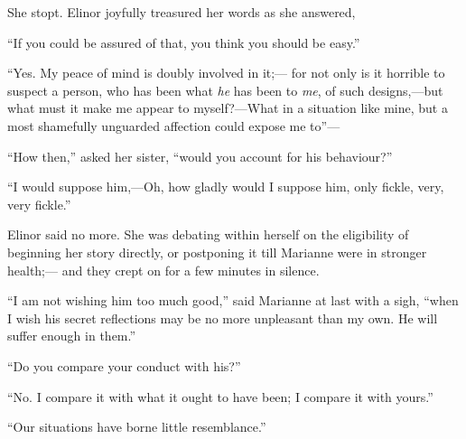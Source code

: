 She stopt.  Elinor joyfully treasured her words
as she answered,

``If you could be assured of that, you think you
should be easy.''

``Yes. My peace of mind is doubly involved in it;---%
for not only is it horrible to suspect a person, who has
been what \emph{he} has been to \emph{me}, of such designs,---but what must
it make me appear to myself?---What in a situation like mine,
but a most shamefully unguarded affection could expose
me to''---%

``How then,'' asked her sister, ``would you account
for his behaviour?''

``I would suppose him,---Oh, how gladly would I suppose him,
only fickle, very, very fickle.''

Elinor said no more.  She was debating within herself
on the eligibility of beginning her story directly,
or postponing it till Marianne were in stronger health;---%
and they crept on for a few minutes in silence.

``I am not wishing him too much good,'' said Marianne
at last with a sigh, ``when I wish his secret reflections
may be no more unpleasant than my own.  He will suffer
enough in them.''

``Do you compare your conduct with his?''

``No. I compare it with what it ought to have been;
I compare it with yours.''

``Our situations have borne little resemblance.''

